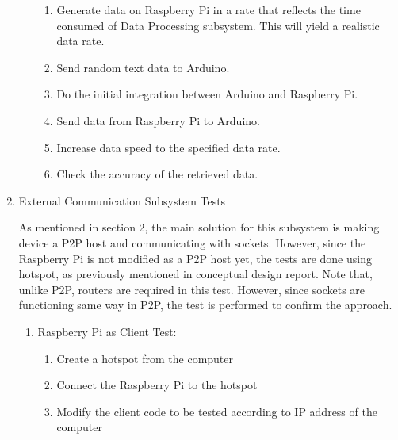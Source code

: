 \documentclass[a4paper,12pt]{article}
\begin{document}
\begin{enumerate}
\begin{enumerate}
\begin{enumerate}

\item Generate data on Raspberry Pi in a rate that reflects the time consumed of Data Processing subsystem. This will yield a realistic data rate.  

\item Send random text data to Arduino.  

\item Do the initial integration between Arduino and Raspberry Pi.  

\item Send data from Raspberry Pi to Arduino.  

\item Increase data speed to the specified data rate.  

\item Check the accuracy of the retrieved data. 

\end{enumerate}

\end{enumerate}





\item {External Communication Subsystem Tests}


As mentioned in section 2, the main solution for this subsystem is making device a P2P host and communicating with sockets. However, since the Raspberry Pi is not modified as a P2P host yet, the tests are done using hotspot, as previously mentioned in conceptual design report. Note that, unlike P2P, routers are required in this test. However, since sockets are functioning same way in P2P, the test is performed to confirm the approach.

\begin{enumerate}


\item Raspberry Pi as Client Test:


\begin{enumerate}

\item Create a hotspot from the computer  

\item Connect the Raspberry Pi to the hotspot  

\item Modify the client code to be tested according to IP address of the computer


\end{enumerate}
\end{enumerate}
\end{enumerate}
\end{document}
